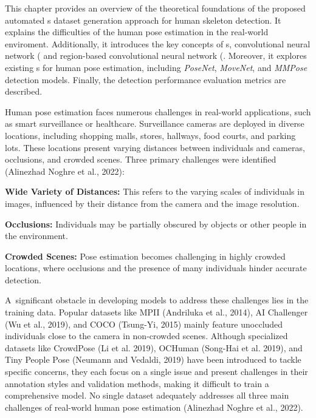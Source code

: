This chapter provides an overview of the theoretical foundations of the proposed automated \NN\-s dataset generation approach for human skeleton detection. It explains the difficulties of the human pose estimation in the real-world enviroment. Additionally, it introduces the key concepts of \NN\-s, convolutional neural network (\CNN\) and region-based convolutional neural network (\RCNN\). Moreover, it explores existing \NN\-s for human pose estimation, including {\em PoseNet}, {\em MoveNet}, and {\em MMPose} detection models. Finally, the detection performance evaluation metrics are described.

Human pose estimation faces numerous challenges in real-world applications, such as smart surveillance or healthcare. Surveillance cameras are deployed in diverse locations, including shopping malls, stores, hallways, food courts, and parking lots. These locations present varying distances between individuals and cameras, occlusions, and crowded scenes. Three primary challenges were identified (\scc Alinezhad Noghre et al., 2022):

\startitemize[n]
    \item {\bf Wide Variety of Distances:} This refers to the varying scales of individuals in images, influenced by their distance from the camera and the image resolution.
    \item {\bf Occlusions:} Individuals may be partially obscured by objects or other people in the environment.
    \item {\bf Crowded Scenes:} Pose estimation becomes challenging in highly crowded locations, where occlusions and the presence of many individuals hinder accurate detection.
\stopitemize

A~significant obstacle in developing models to address these challenges lies in the training data. Popular datasets like MPII (\scc Andriluka et al., 2014), AI Challenger (\scc Wu et al., 2019), and COCO (\scc Tsung-Yi, 2015) mainly feature unoccluded individuals close to the camera in non-crowded scenes. Although specialized datasets like CrowdPose (\scc Li et al. 2019), OCHuman (\scc Song-Hai et al. 2019), and Tiny People Pose (\scc Neumann and Vedaldi, 2019) have been introduced to tackle specific concerns, they each focus on a single issue and present challenges in their annotation styles and validation methods, making it difficult to train a comprehensive model. No single dataset adequately addresses all three main challenges of real-world human pose estimation (\scc Alinezhad Noghre et al., 2022).

